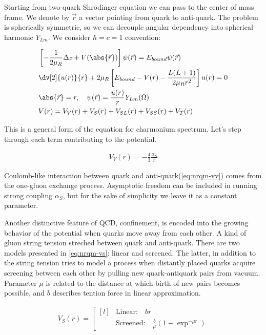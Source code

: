 Starting from two-quark Shrodinger equation we can pass to the center of mass frame. We denote by $\vec{r}$ a vector pointing from quark to anti-quark. The problem is spherically symmetric, so we can decouple angular dependency into spherical harmonic $Y_{Lm}$. We consider $\hbar = c = 1$ convention:

\begin{align}
    &\left[ -\frac{1}{2 \mu_R} \Delta_{\vec{r}} + V(\abs{\vec{r}}) \right] \psi(\vec{r}) = E_{bound} \psi(\vec{r}) \\
    &\dv[2]{u(r)}{r} + 2 \mu_R \left[ E_{bound} - V(r) - \frac{L(L+1)}{2 \mu_R r^2} \right] u(r) = 0 \label{eq:nrqm-radialeq} \\
    &\abs{\vec{r}} = r ,\quad \psi(\vec{r}) = \frac{u(r)}{r} Y_{Lm}(\Omega) \\
    &V(r) = V_V(r) +V_S(r) + V_{SL}(r) + V_{SS}(r) + V_T(r)
\end{align}

This is a general form of the equation for charmonium spectrum. Let's step through each term contributing to the potential.

\begin{align} \label{eq:nrqm-vv}
    V_V(r) = -\frac{4}{3} \frac{\alpha_S}{r}
\end{align}

Coulomb-like interaction between quark and anti-quark(\cref{eq:nrqm-vv}) comes from the one-gluon exchange process. Asymptotic freedom can be included in running strong coupling $\alpha_S$, but for the sake of simplicity we leave it as a constant parameter.

Another distinctive feature of QCD, confinement, is encoded into the growing behavior of the potential when quarks move away from each other. A kind of gluon string tension streched between quark and anti-quark. There are two models presented in \cref{eq:nrqm-vs}: linear and screened. The latter, in addition to the string tension tries to model a process when distantly placed quarks acquire screening between each other by pulling new quark-antiquark pairs from vacuum. Parameter $\mu$ is related to the distance at which birth of new pairs becomes possible, and $b$ describes tention force in linear approximation.

\begin{align} \label{eq:nrqm-vs}
    V_S(r) = \left[ \begin{matrix*}[l]
                    &\text{Linear:}\quad br \\
                    &\text{Screened:}\quad \frac{b}{\mu} (1 - \exp^{-\mu r})
              \end{matrix*} \right.
\end{align}

